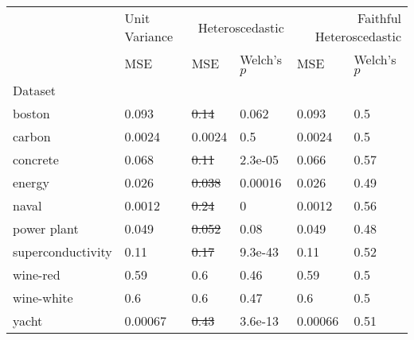 \begin{tabular}{l|l|ll|ll}
\toprule
 & Unit Variance & \multicolumn{2}{r}{Heteroscedastic} & \multicolumn{2}{r}{Faithful Heteroscedastic} \\
 & MSE & MSE & Welch's $p$ & MSE & Welch's $p$ \\
Dataset &  &  &  &  &  \\
\midrule
boston & 0.093 & \sout{0.14} & 0.062 & 0.093 & 0.5 \\
carbon & 0.0024 & 0.0024 & 0.5 & 0.0024 & 0.5 \\
concrete & 0.068 & \sout{0.11} & 2.3e-05 & 0.066 & 0.57 \\
energy & 0.026 & \sout{0.038} & 0.00016 & 0.026 & 0.49 \\
naval & 0.0012 & \sout{0.24} & 0 & 0.0012 & 0.56 \\
power plant & 0.049 & \sout{0.052} & 0.08 & 0.049 & 0.48 \\
superconductivity & 0.11 & \sout{0.17} & 9.3e-43 & 0.11 & 0.52 \\
wine-red & 0.59 & 0.6 & 0.46 & 0.59 & 0.5 \\
wine-white & 0.6 & 0.6 & 0.47 & 0.6 & 0.5 \\
yacht & 0.00067 & \sout{0.43} & 3.6e-13 & 0.00066 & 0.51 \\
\bottomrule
\end{tabular}
